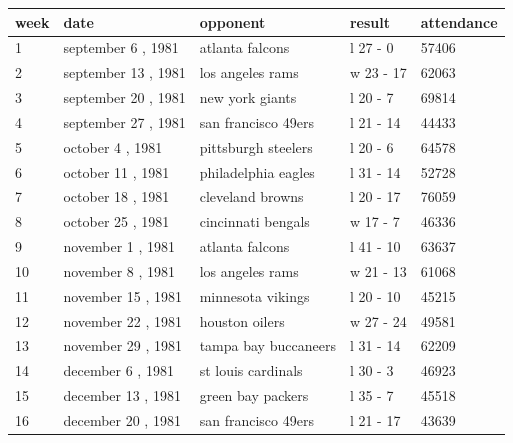\documentclass{article}
\begin{document}
\begin{tabular}{lllll}
\toprule
week & date & opponent & result & attendance \\
\midrule
1 & september 6 , 1981 & atlanta falcons & l 27 - 0 & 57406 \\
2 & september 13 , 1981 & los angeles rams & w 23 - 17 & 62063 \\
3 & september 20 , 1981 & new york giants & l 20 - 7 & 69814 \\
4 & september 27 , 1981 & san francisco 49ers & l 21 - 14 & 44433 \\
5 & october 4 , 1981 & pittsburgh steelers & l 20 - 6 & 64578 \\
6 & october 11 , 1981 & philadelphia eagles & l 31 - 14 & 52728 \\
7 & october 18 , 1981 & cleveland browns & l 20 - 17 & 76059 \\
8 & october 25 , 1981 & cincinnati bengals & w 17 - 7 & 46336 \\
9 & november 1 , 1981 & atlanta falcons & l 41 - 10 & 63637 \\
10 & november 8 , 1981 & los angeles rams & w 21 - 13 & 61068 \\
11 & november 15 , 1981 & minnesota vikings & l 20 - 10 & 45215 \\
12 & november 22 , 1981 & houston oilers & w 27 - 24 & 49581 \\
13 & november 29 , 1981 & tampa bay buccaneers & l 31 - 14 & 62209 \\
14 & december 6 , 1981 & st louis cardinals & l 30 - 3 & 46923 \\
15 & december 13 , 1981 & green bay packers & l 35 - 7 & 45518 \\
16 & december 20 , 1981 & san francisco 49ers & l 21 - 17 & 43639 \\
\bottomrule
\end{tabular}
\end{document}
